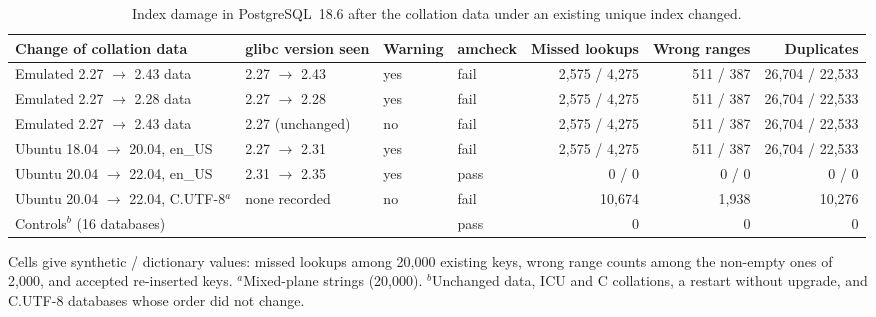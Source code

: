 \begin{table}[t]
\centering\small
\caption{Index damage in PostgreSQL~18.6 after the collation data under an existing unique index changed.}
\label{tab:drift}
\begin{tabular}{@{}llllrrr@{}}
\toprule
Change of collation data & glibc version seen & Warning & amcheck & Missed lookups & Wrong ranges & Duplicates \\
\midrule
Emulated 2.27 $\to$ 2.43 data & 2.27 $\to$ 2.43 & yes & fail & 2,575 / 4,275 & 511 / 387 & 26,704 / 22,533 \\
Emulated 2.27 $\to$ 2.28 data & 2.27 $\to$ 2.28 & yes & fail & 2,575 / 4,275 & 511 / 387 & 26,704 / 22,533 \\
Emulated 2.27 $\to$ 2.43 data & 2.27 (unchanged) & no & fail & 2,575 / 4,275 & 511 / 387 & 26,704 / 22,533 \\
Ubuntu 18.04 $\to$ 20.04, en\_US & 2.27 $\to$ 2.31 & yes & fail & 2,575 / 4,275 & 511 / 387 & 26,704 / 22,533 \\
Ubuntu 20.04 $\to$ 22.04, en\_US & 2.31 $\to$ 2.35 & yes & pass & 0 / 0 & 0 / 0 & 0 / 0 \\
Ubuntu 20.04 $\to$ 22.04, C.UTF-8$^{a}$ & none recorded & no & fail & 10,674 & 1,938 & 10,276 \\
Controls$^{b}$ (16 databases) & & & pass & 0 & 0 & 0 \\
\bottomrule
\end{tabular}

\smallskip\footnotesize
Cells give synthetic / dictionary values: missed lookups among 20,000 existing keys, wrong range counts among the non-empty ones of 2,000, and accepted re-inserted keys. $^{a}$Mixed-plane strings (20,000). $^{b}$Unchanged data, ICU and C collations, a restart without upgrade, and C.UTF-8 databases whose order did not change.
\end{table}

